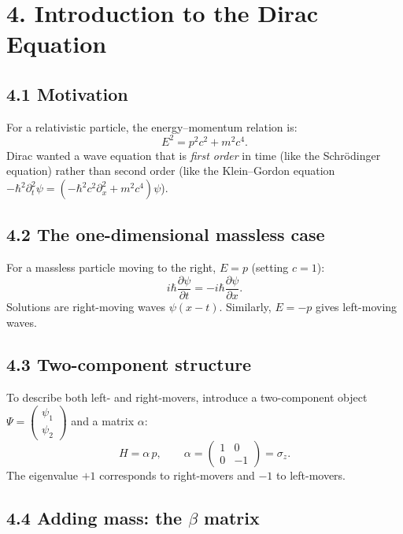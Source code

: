 \documentclass[12pt,a4paper]{article}
\begin{document}
\section{4. Introduction to the Dirac Equation}

\subsection{4.1 Motivation}

For a relativistic particle, the energy--momentum relation is:
\[
    E^2 = p^2c^2 + m^2c^4.
\]
Dirac wanted a wave equation that is \emph{first order} in time (like the Schr\"odinger equation) rather than second order (like the Klein--Gordon equation $-\hbar^2\partial_t^2\psi = (-\hbar^2c^2\partial_x^2 + m^2c^4)\psi$).

\subsection{4.2 The one-dimensional massless case}

For a massless particle moving to the right, $E = p$ (setting $c = 1$):
\[
    i\hbar\frac{\partial\psi}{\partial t} = -i\hbar\frac{\partial\psi}{\partial x}.
\]
Solutions are right-moving waves $\psi(x - t)$.  Similarly, $E = -p$ gives left-moving waves.

\subsection{4.3 Two-component structure}

To describe both left- and right-movers, introduce a two-component object $\Psi = \begin{pmatrix} \psi_1 \\ \psi_2 \end{pmatrix}$ and a matrix $\alpha$:
\[
    H = \alpha\, p, \qquad \alpha = \begin{pmatrix} 1 & 0 \\ 0 & -1 \end{pmatrix} = \sigma_z.
\]
The eigenvalue $+1$ corresponds to right-movers and $-1$ to left-movers.

\subsection{4.4 Adding mass: the $\beta$ matrix}
\end{document}
